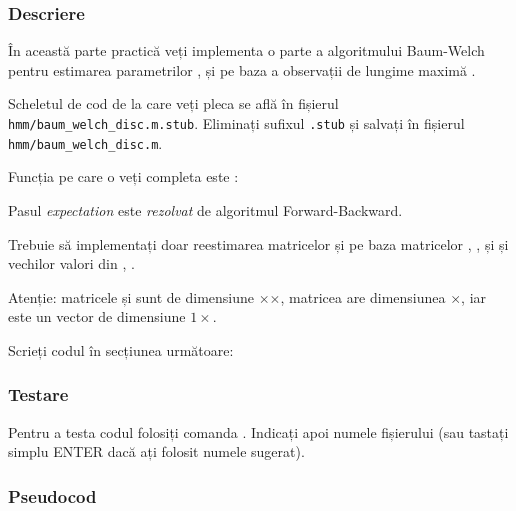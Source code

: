 \documentclass[12pt]{article}
\begin{document}
\subsubsection{Descriere}
\label{sec:desc}

În această parte practică veți implementa o parte a algoritmului
Baum-Welch pentru estimarea parametrilor , și
 pe baza a  observații de lungime maximă
.

Scheletul de cod de la care veți pleca se află în fișierul\\
\texttt{hmm/baum\_welch\_disc.m.stub}. Eliminați sufixul
\texttt{.stub} și salvați în fișierul
\texttt{hmm/baum\_welch\_disc.m}.

Funcția pe care o veți completa este :




Pasul \emph{expectation} este \emph{rezolvat} de algoritmul
Forward-Backward.




Trebuie să implementați doar reestimarea matricelor  și
 pe baza matricelor , ,
 și  și vechilor valori din ,
.

Atenție: matricele  și  sunt de dimensiune
$\times$$\times$, matricea  are
dimensiunea $\times$, iar  este un vector de
dimensiune $1\times$.

Scrieți codul în secțiunea următoare:



\subsubsection{Testare}
\label{sec:test-bm}

Pentru a testa codul folosiți comanda
.  Indicați apoi numele
fișierului (sau tastați simplu ENTER dacă ați folosit numele sugerat).

\subsubsection{Pseudocod}
\label{sec:pseudo}
\end{document}
